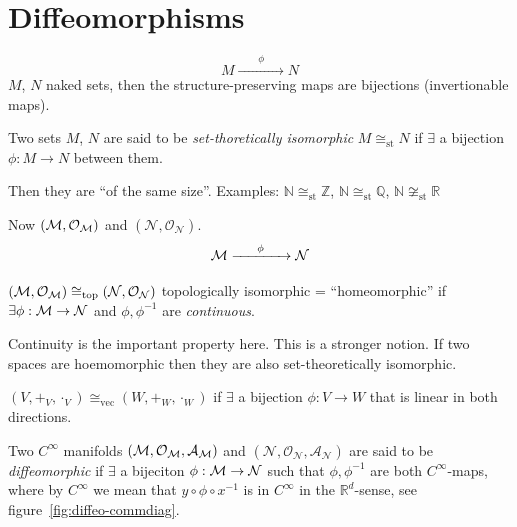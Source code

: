 \documentclass[11pt, a4paper, twocolumn]{article} %
\begin{document}
\section{Diffeomorphisms}
\begin{equation*}
    M \xrightarrow{\phantom{asdf}\phi\phantom{asdf}} N
\end{equation*}
$M$, $N$ naked sets, then the structure-preserving maps are bijections (invertionable maps).
\begin{defn}
    Two sets $M$, $N$ are said to be \textit{set-thoretically isomorphic} $M\cong_\text{st} N$ if
    $\exists$ a bijection $\phi: M\to N$ between them.
\end{defn}
\begin{note}
    Then they are ``of the same size''. Examples: $\mathbb{N}\cong_\text{st}\mathbb{Z}$, $\mathbb{N}\cong_\text{st} \mathbb{Q}$,
    $\mathbb{N}\not\cong_\text{st} \mathbb{R}$
\end{note}
Now $(\mathcal{M}, \mathcal{O}_{\mathcal{M}})$ and $(\mathcal{N}, \mathcal{O_N})$.
\begin{equation*}
    \mathcal{M} \xrightarrow{\phantom{asdf}\phi\phantom{asdf}} \mathcal{N}
\end{equation*}
\begin{defn}
    $(\mathcal{M}, \mathcal{O}_{\mathcal{M}}) \cong_\text{top} (\mathcal{N}, \mathcal{O_N})$ topologically isomorphic = ``homeomorphic'' if $\exists \phi: \mathcal{M}\to\mathcal{N}$ and $\phi, \phi^{-1}$ are \textit{continuous}.
\end{defn}
\begin{note}
    Continuity is the important property here.
    This is a stronger notion. If two spaces are hoemomorphic then they are also set-theoretically isomorphic.
\end{note}
\begin{defn}
    $(V, +_V, \cdot_V) \cong_\text{vec} (W, +_W, \cdot_W)$ if $\exists$ a bijection $\phi:V\to W$ that is
    linear in both directions.
\end{defn}
\begin{defn}[diffeomorphic]
    Two $C^\infty$ manifolds $(\mathcal{M}, \mathcal{O_M}, \mathcal{A_M})$ and $(\mathcal{N, O_N, A_N})$
    are said to be \textit{diffeomorphic} if $\exists$ a bijeciton $\phi: \mathcal{M} \to \mathcal{N}$ such that
    $\phi, \phi^{-1}$ are both $C^\infty$-maps, where by $C^\infty$ we mean that $y\circ \phi \circ x^{-1}$
    is in $C^\infty$ in the $\mathbb{R}^d$-sense, see figure~\ref{fig:diffeo-commdiag}.
    \label{def:diffeomorphic}
\end{defn}
\end{document}
